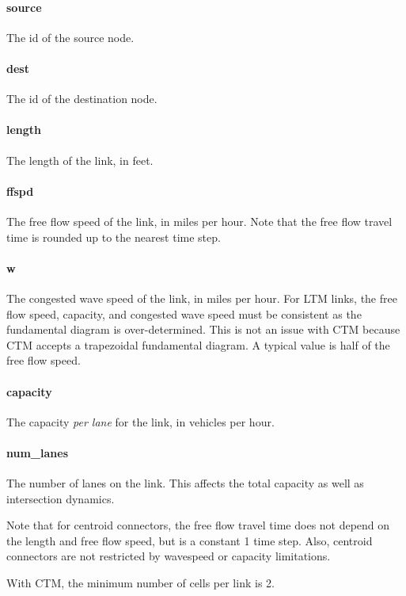 \paragraph*{source} The id of the source node.
\paragraph*{dest} The id of the destination node.
\paragraph*{length} The length of the link, in feet. 
\paragraph*{ffspd} The free flow speed of the link, in miles per hour. Note that the free flow travel time is rounded up to the nearest time step.
\paragraph*{w} The congested wave speed of the link, in miles per hour. For LTM links, the free flow speed, capacity, and congested wave speed must be consistent as the fundamental diagram is over-determined. This is not an issue with CTM because CTM accepts a trapezoidal fundamental diagram. A typical value is half of the free flow speed.
\paragraph*{capacity} The capacity \textit{per lane} for the link, in vehicles per hour.
\paragraph*{num\_lanes} The number of lanes on the link. This affects the total capacity as well as intersection dynamics.

Note that for centroid connectors, the free flow travel time does not depend on the length and free flow speed, but is a constant 1 time step. Also, centroid connectors are not restricted by wavespeed or capacity limitations. 

With CTM, the minimum number of cells per link is 2.